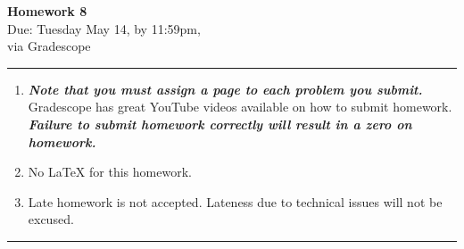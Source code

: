 \documentclass[12pt]{article}
\newif\ifshow
\begin{document}
\begin{center}
\ifshow
  \textbf{\Large Homework 8 Solution}\\
\else
  \textbf{\Large Homework 8}\\
\fi
Due: Tuesday May 14, by 11:59pm,\\via Gradescope\\
\end{center}

\hrule

\vspace{0.2cm}

\begin{enumerate}[$\bullet$]
\item  {\textbf{\textit{Note that you must assign a page to each problem you submit.}}}   Gradescope has great YouTube videos available on how to submit homework.  \textit{\textbf{Failure to submit homework correctly will result in a zero on homework.}}
\item No LaTeX for this homework.  
\item Late homework is not accepted.  Lateness due to technical issues will not be excused.  
\end{enumerate}

\hrule

\vspace{0.5cm}
\end{document}

